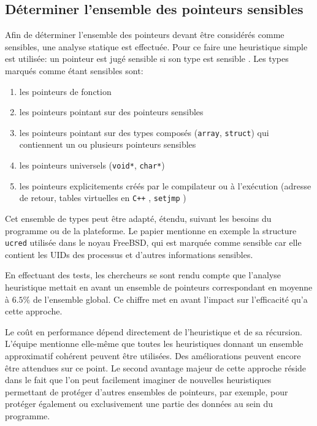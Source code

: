\subsection{Déterminer l'ensemble des pointeurs sensibles}
\label{subsection:detEnsemblePointeursSensible}

Afin de déterminer l'ensemble des pointeurs devant être considérés comme sensibles, une analyse statique est effectuée. Pour ce faire une heuristique simple est utilisée: \og un pointeur est jugé sensible si son type est sensible \fg. Les types marqués comme étant sensibles sont:

\begin{enumerate}
	\item les pointeurs de fonction
	\item les pointeurs pointant sur des pointeurs sensibles
	\item les pointeurs pointant sur des types composés (\texttt{array}, \texttt{struct}) qui contiennent un ou plusieurs pointeurs sensibles
	\item les pointeurs universels (\texttt{void*}, \texttt{char*})
  \item les pointeurs explicitements créés par le compilateur ou à l'exécution (adresse de retour, tables virtuelles en \texttt{C++} \cite{fonctionsVirtuelles}, \texttt{setjmp} \cite{setjmp})
\end{enumerate}

Cet ensemble de types peut être adapté, étendu, suivant les besoins du programme ou de la plateforme. Le papier mentionne en exemple la structure \texttt{ucred} utilisée dans le noyau FreeBSD, qui est marquée comme sensible car elle contient les UIDs des processus et d'autres informations sensibles.

En effectuant des tests, les chercheurs se sont rendu compte que l'analyse heuristique mettait en avant un ensemble de pointeurs correspondant en moyenne à $6.5\%$ de l'ensemble global. Ce chiffre met en avant l'impact sur l'efficacité qu'a cette approche.

Le coût en performance dépend directement de l'heuristique et de sa récursion. L'équipe mentionne elle-même que toutes les heuristiques donnant un ensemble approximatif cohérent peuvent être utilisées. Des améliorations peuvent encore être attendues sur ce point. Le second avantage majeur de cette approche réside dans le fait que l'on peut facilement imaginer de nouvelles heuristiques permettant de protéger d'autres ensembles de pointeurs, par exemple, pour protéger également ou exclusivement une partie des données au sein du programme.

